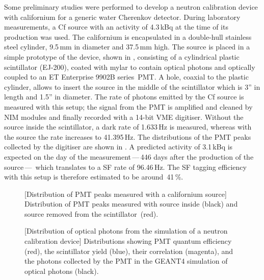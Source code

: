 Some preliminary studies were performed to develop a neutron calibration device %
with californium for a generic water Cherenkov detector.
During laboratory measurements, a Cf source with an activity of 4.3\,kBq at the time of its production was used.
The californium is encapsulated in a double-hull stainless steel cylinder, 9.5\,mm in diameter and 37.5\,mm high.
The source is placed in a simple prototype of the device, shown in , %
consisting of a cylindrical plastic scintillator (EJ-200), coated with mylar to contain optical photons %
and optically coupled to an ET Enterprise 9902B series~PMT.
A hole, coaxial to the plastic cylinder, allows to insert the source in the middle of the scintillator %
which is 3'' in length and 1.5'' in diameter.
The rate of photons emitted by the Cf source is measured with this setup; %
the signal from the PMT is amplified and cleaned by NIM modules and finally recorded with a 14-bit VME digitiser.
Without the source inside the scintillator, a dark rate of 1.633\,Hz is measured, %
whereas with the source the rate increases to 41.395\,Hz.
The distributions of the PMT peaks collected by the digitiser are shown in .
A predicted activity of 3.1\,kBq is expected on the day of the measurement\,---\,446 days after the production of the source\,---\, %
which translates to a SF rate of 96.46\,Hz.
The SF tagging efficiency with this setup is therefore estimated to be around~41\,\%.

\begin{figure}
	\begin{minipage}[t]{0.48\textwidth}
		\centering
		\resizebox{\textwidth}{!}{}
		[Distribution of PMT peaks measured with a californium source]%
		{Distribution of PMT peaks measured with source inside (black) and source removed from the scintillator~(red).}
		\label{fig:source}
	\end{minipage}
	\hfill
	\begin{minipage}[t]{0.48\textwidth}
		\centering
		\resizebox{\textwidth}{!}{}
		[Distribution of optical photons from the simulation of a neutron calibration device]{%
			Distributions showing PMT quantum efficiency (red), the scintillator yield (blue), %
			their correlation (magenta), and the photons collected by the PMT in the GEANT4 %
			simulation of optical photons (black).}
		\label{fig:QE}
	\end{minipage}
\end{figure}


